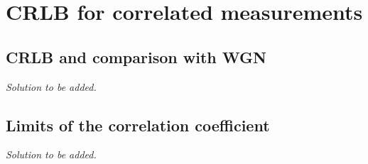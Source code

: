 \section{CRLB for correlated measurements}

\subsection{CRLB and comparison with WGN}

\emph{Solution to be added.}

\subsection{Limits of the correlation coefficient}

\emph{Solution to be added.}
